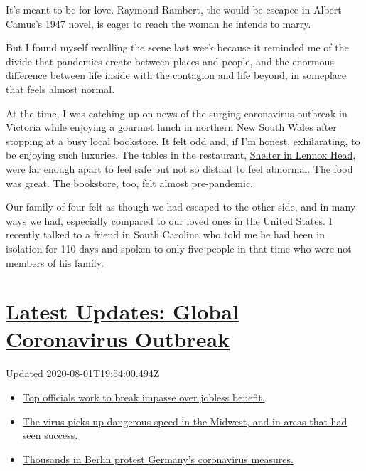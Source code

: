 It's meant to be for love. Raymond Rambert, the would-be escapee in
Albert Camus's 1947 novel, is eager to reach the woman he intends to
marry.

But I found myself recalling the scene last week because it reminded me
of the divide that pandemics create between places and people, and the
enormous difference between life inside with the contagion and life
beyond, in someplace that feels almost normal.

At the time, I was catching up on news of the surging coronavirus
outbreak in Victoria while enjoying a gourmet lunch in northern New
South Wales after stopping at a busy local bookstore. It felt odd and,
if I'm honest, exhilarating, to be enjoying such luxuries. The tables in
the restaurant,
\href{https://www.nytimes3xbfgragh.onion/2018/08/16/dining/restaurants-northern-rivers-byron-bay.html}{Shelter
in Lennox Head}, were far enough apart to feel safe but not so distant
to feel abnormal. The food was great. The bookstore, too, felt almost
pre-pandemic.

Our family of four felt as though we had escaped to the other side, and
in many ways we had, especially compared to our loved ones in the United
States. I recently talked to a friend in South Carolina who told me he
had been in isolation for 110 days and spoken to only five people in
that time who were not members of his family.

\hypertarget{latest-updates-global-coronavirus-outbreak}{%
\section{\texorpdfstring{\href{https://www.nytimes3xbfgragh.onion/2020/08/01/world/coronavirus-covid-19.html?action=click\&pgtype=Article\&state=default\&region=MAIN_CONTENT_1\&context=storylines_live_updates}{Latest
Updates: Global Coronavirus
Outbreak}}{Latest Updates: Global Coronavirus Outbreak}}\label{latest-updates-global-coronavirus-outbreak}}

Updated 2020-08-01T19:54:00.494Z

\begin{itemize}
\tightlist
\item
  \href{https://www.nytimes3xbfgragh.onion/2020/08/01/world/coronavirus-covid-19.html?action=click\&pgtype=Article\&state=default\&region=MAIN_CONTENT_1\&context=storylines_live_updates\#link-3ac56579}{Top
  officials work to break impasse over jobless benefit.}
\item
  \href{https://www.nytimes3xbfgragh.onion/2020/08/01/world/coronavirus-covid-19.html?action=click\&pgtype=Article\&state=default\&region=MAIN_CONTENT_1\&context=storylines_live_updates\#link-8796723}{The
  virus picks up dangerous speed in the Midwest, and in areas that had
  seen success.}
\item
  \href{https://www.nytimes3xbfgragh.onion/2020/08/01/world/coronavirus-covid-19.html?action=click\&pgtype=Article\&state=default\&region=MAIN_CONTENT_1\&context=storylines_live_updates\#link-25930521}{Thousands
  in Berlin protest Germany's coronavirus measures.}
\end{itemize}

